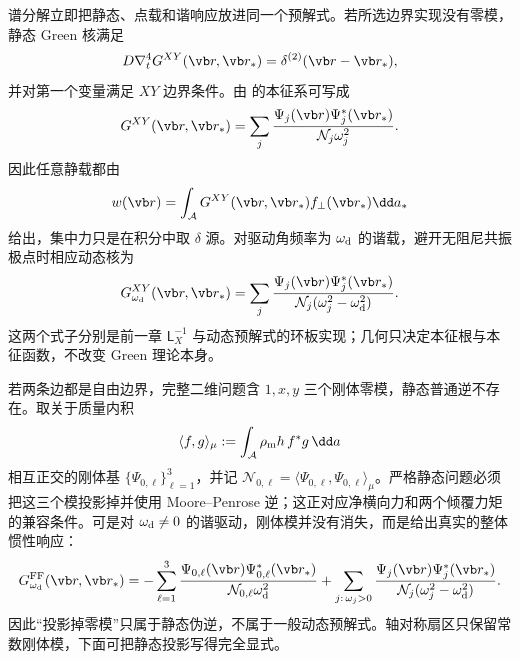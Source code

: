 \label{sec:phys-sm-green-dynamic}

谱分解立即把静态、点载和谐响应放进同一个预解式。若所选边界实现没有零模，静态 Green 核满足
\[
 D\nabla_t^4G^{XY}(\vb r,\vb r_*)
 =\delta^{(2)}(\vb r-\vb r_*),
\]
并对第一个变量满足 \(XY\) 边界条件。由 的本征系可写成
\begin{equation}
 G^{XY}(\vb r,\vb r_*)
 =\sum_j
 \frac{\Psi_j(\vb r)\Psi_j^*(\vb r_*)}
 {\mathcal N_j\omega_j^2}.
 \label{eq:phys-sm-annulus-static-green-spectral}
\end{equation}
因此任意静载都由
\[
 w(\vb r)=\int_{\mathcal A}G^{XY}(\vb r,\vb r_*)f_\perp(\vb r_*)\dd a_*
\]
给出，集中力只是在积分中取 \(\delta\) 源。对驱动角频率为 \(\omega_{\rm d}\) 的谐载，避开无阻尼共振极点时相应动态核为
\begin{equation}
 G_{\omega_{\rm d}}^{XY}(\vb r,\vb r_*)
 =\sum_j
 \frac{\Psi_j(\vb r)\Psi_j^*(\vb r_*)}
 {\mathcal N_j(\omega_j^2-\omega_{\rm d}^2)}.
 \label{eq:phys-sm-annulus-dynamic-green-spectral}
\end{equation}
这两个式子分别是前一章 \(\mathsf L_X^{-1}\) 与动态预解式的环板实现；几何只决定本征根与本征函数，不改变 Green 理论本身。

若两条边都是自由边界，完整二维问题含 \(1,x,y\) 三个刚体零模，静态普通逆不存在。取关于质量内积
\[
 \langle f,g\rangle_\mu
 :=\int_{\mathcal A}\rho_{\rm m} h\,f^*g\,\dd a
\]
相互正交的刚体基 \(\{\Psi_{0,\ell}\}_{\ell=1}^3\)，并记
\(
 \mathcal N_{0,\ell}=\langle\Psi_{0,\ell},\Psi_{0,\ell}\rangle_\mu
\)。严格静态问题必须把这三个模投影掉并使用 Moore--Penrose 逆；这正对应净横向力和两个倾覆力矩的兼容条件。可是对 \(\omega_{\rm d}\neq0\) 的谐驱动，刚体模并没有消失，而是给出真实的整体惯性响应：
\begin{equation}
 G_{\omega_{\rm d}}^{\mathrm{FF}}(\vb r,\vb r_*)
 =-\sum_{\ell=1}^{3}
 \frac{\Psi_{0,\ell}(\vb r)\Psi_{0,\ell}^*(\vb r_*)}
 {\mathcal N_{0,\ell}\omega_{\rm d}^2}
 +\sum_{j:\,\omega_j>0}
 \frac{\Psi_j(\vb r)\Psi_j^*(\vb r_*)}
 {\mathcal N_j(\omega_j^2-\omega_{\rm d}^2)}.
 \label{eq:phys-sm-annulus-ff-dynamic-zero-modes}
\end{equation}
因此“投影掉零模”只属于静态伪逆，不属于一般动态预解式。轴对称扇区只保留常数刚体模，下面可把静态投影写得完全显式。

\label{sec:phys-sm-eight-green}

